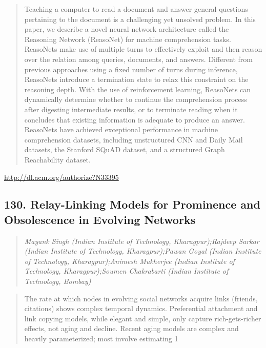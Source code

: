 \documentclass{article}
\begin{document}
\begin{quote}
Teaching a computer to read a document and answer general questions pertaining to the document is a challenging yet unsolved problem. In this paper, we describe a novel neural network architecture called the Reasoning Network ({ReasoNet}) for machine comprehension tasks. ReasoNets make use of multiple turns to effectively exploit and then reason over the relation among queries, documents, and answers. Different from previous approaches using a fixed number of turns during inference, ReasoNets introduce a termination state to relax this constraint on the reasoning depth. With the use of reinforcement learning, ReasoNets can dynamically determine whether to continue the comprehension process after digesting intermediate results, or to terminate reading when it concludes that existing information is adequate to produce an answer. ReasoNets have achieved exceptional performance in machine comprehension datasets, including unstructured CNN and Daily Mail datasets, the Stanford SQuAD dataset, and a structured Graph Reachability dataset.
\end{quote}

\href{http://dl.acm.org/authorize?N33395}{http://dl.acm.org/authorize?N33395}

\subsection{130. Relay-Linking Models for Prominence and Obsolescence in Evolving Networks}

\begin{quote}
\footnotesize{\textit{Mayank Singh (Indian Institute of Technology, Kharagpur);Rajdeep Sarkar (Indian Institute of Technology, Kharagpur);Pawan Goyal (Indian Institute of Technology, Kharagpur);Animesh Mukherjee (Indian Institute of Technology, Kharagpur);Soumen Chakrabarti (Indian Institute of Technology, Bombay)}}

\end{quote}

\begin{quote}
The rate at which nodes in evolving social networks acquire links (friends, citations) shows complex temporal dynamics. Preferential attachment and link copying models, while elegant and simple, only capture rich-gets-richer effects, not aging and decline. Recent aging models are complex and heavily parameterized; most involve estimating 1
\end{quote}
\end{document}
